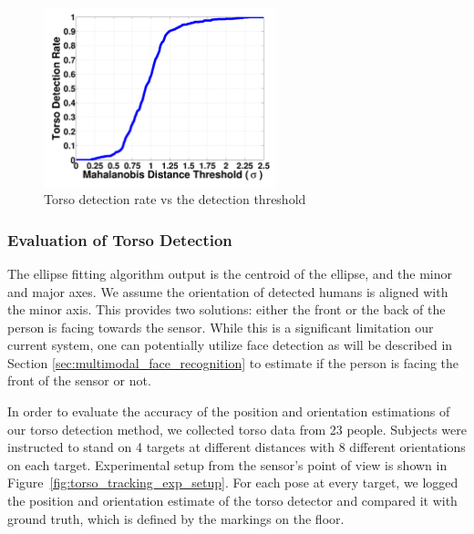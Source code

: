 \begin{figure}[ht!]
\centering
\includegraphics[width=0.6\textwidth]{pics/torso_detection_rate}
\caption{Torso detection rate vs the detection threshold}
\label{fig:torso_detection_rate}
\end{figure}

\subsubsection{Evaluation of Torso Detection}

The ellipse fitting algorithm output is the centroid of the ellipse, and the minor and major axes. We assume the orientation of detected humans is aligned with the minor axis. This provides two solutions: either the front or the back of the person is facing towards the sensor. While this is a significant limitation our current system, one can potentially utilize face detection as will be described in Section \ref{sec:multimodal_face_recognition} to estimate if the person is facing the front of the sensor or not.

In order to evaluate the accuracy of the position and orientation estimations of our torso detection method, we collected torso data from 23 people. Subjects were instructed to stand on 4 targets at different distances with 8 different orientations on each target. Experimental setup from the sensor's point of view is shown in Figure~\ref{fig:torso_tracking_exp_setup}. For each pose at every target, we logged the position and orientation estimate of the torso detector and compared it with ground truth, which is defined by the markings on the floor.

